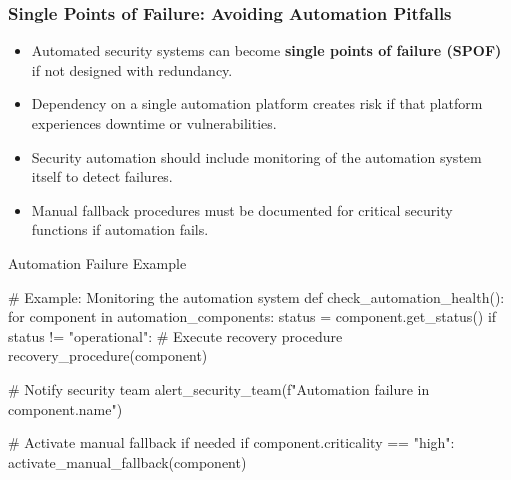 \documentclass{beamer}
\begin{document}
\begin{frame}[fragile]
  \frametitle{Single Points of Failure: Avoiding Automation Pitfalls}
  
  \begin{itemize}
    \item Automated security systems can become \textbf{single points of failure (SPOF)} if not designed with redundancy.
    \item Dependency on a single automation platform creates risk if that platform experiences downtime or vulnerabilities.
    \item Security automation should include monitoring of the automation system itself to detect failures.
    \item Manual fallback procedures must be documented for critical security functions if automation fails.
  \end{itemize}
  
  \begin{block}{Automation Failure Example}
    \tiny
    \begin{semiverbatim}
# Example: Monitoring the automation system
def check_automation_health():
    for component in automation_components:
        status = component.get_status()
        if status != "operational":
            # Execute recovery procedure
            recovery_procedure(component)
            
            # Notify security team
            alert_security_team(f"Automation failure in {component.name}")
            
            # Activate manual fallback if needed
            if component.criticality == "high":
                activate_manual_fallback(component)
    \end{semiverbatim}
  \end{block}
\end{frame}
\end{document}
